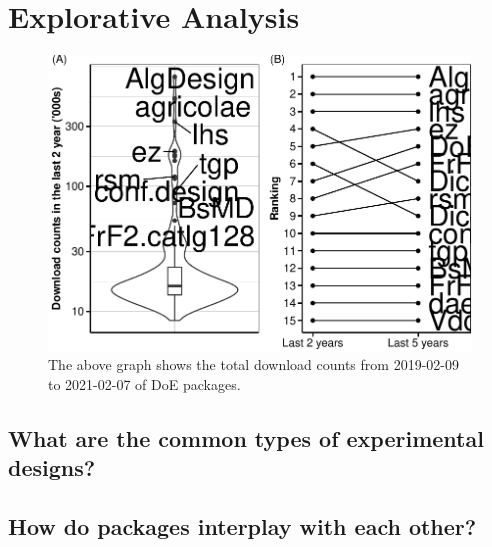 \hypertarget{explorative-analysis}{%
\section{Explorative Analysis}\label{explorative-analysis}}

\begin{Schunk}
\begin{figure}[htbp]

{\centering \includegraphics{paper_files/figure-latex/unnamed-chunk-1-1} 

}

\caption[The above graph shows the total download counts from 2019-02-09 to 2021-02-07 of DoE packages]{The above graph shows the total download counts from 2019-02-09 to 2021-02-07 of DoE packages.}\label{fig:unnamed-chunk-1}
\end{figure}
\end{Schunk}

\hypertarget{what-are-the-common-types-of-experimental-designs}{%
\subsection{What are the common types of experimental
designs?}\label{what-are-the-common-types-of-experimental-designs}}

\hypertarget{how-do-packages-interplay-with-each-other}{%
\subsection{How do packages interplay with each
other?}\label{how-do-packages-interplay-with-each-other}}


